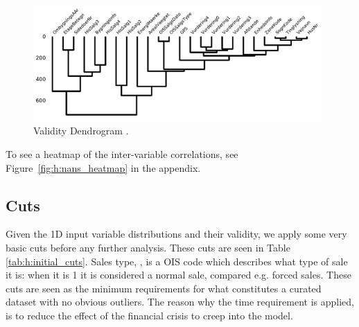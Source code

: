 \begin{figure}
  \includegraphics[width=0.98\textwidth, trim=35 10 0 10, clip]{figures/housing/missing_dendrogram.pdf}
  \caption[Validity Dendrogram]
          {Validity Dendrogram \TODO.}
  \label{fig:h:nans_dendrogram}
\end{figure}

To see a heatmap of the inter-variable correlations, see Figure~\ref{fig:h:nans_heatmap} in the appendix. 

\subsection{Cuts}
Given the 1D input variable distributions and their validity, we apply some very basic cuts before any further analysis. These cuts are seen in Table \ref{tab:h:initial_cuts}. Sales type, , is a OIS code which describes what type of sale it is: when it is \num{1} it is considered a normal sale, compared e.g. forced sales. These cuts are seen as the minimum requirements for what constitutes a curated dataset with no obvious outliers. The reason why the time requirement is applied, is to reduce the effect of the financial crisis to creep into the model. 

